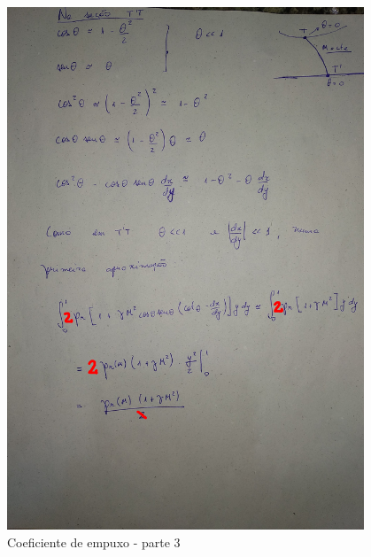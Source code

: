 \documentclass[12pt,a4paper]{article}
\begin{document}
\begin{figure}[!ht]
	\centering
	\includegraphics[width=0.95\textwidth]{./fig/CT3}
	\caption{Coeficiente de empuxo - parte 3}
	\label{fig:CT3}
\end{figure}
\end{document}

